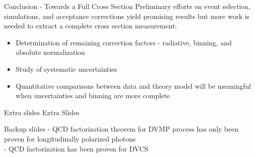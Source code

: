 \documentclass[aspectratio=169]{beamer}
\begin{document}
\begin{frame}{Conclusion - Towards a Full Cross Section}
Preliminary efforts on event selection, simulations, and acceptance corrections yield promising results but more work is needed to extract a complete cross section measurement:
\vspace{0.4cm}
\begin{itemize}
    \setlength\itemsep{1em}
    \item Determination of remaining correction factors - radiative, binning, and absolute normalization
    \item Study of systematic uncertainties 
    \item Quantitative comparisons between data and theory model will be meaningful when uncertainties and binning are more complete
\end{itemize}
    
\end{frame}



\appendix





\begin{frame}{Extra slides}
Extra Slides

\end{frame}

\begin{frame}{Backup slides}
      - QCD factorization theorem for DVMP process has only been proven for longitudinally polarized photons\\
    - QCD factorization has been proven for DVCS
 
\end{frame}
\end{document}
